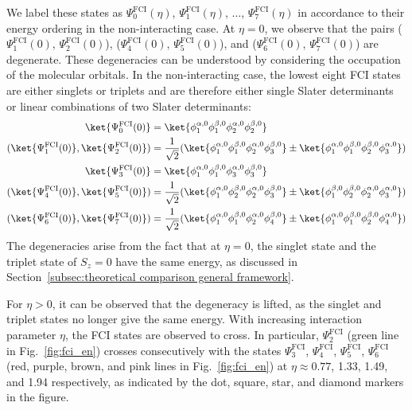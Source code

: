 \documentclass[11pt]{article}
\begin{document}
We label these states as $\Psi_0^{\mathrm{FCI}}(\eta)$, $\Psi_1^{\mathrm{FCI}}(\eta)$, $\ldots$, $\Psi_7^{\mathrm{FCI}}(\eta)$
in accordance to their energy ordering in the non-interacting case. At $\eta=0$, we observe that the pairs ($\Psi_1^{\mathrm{FCI}}(0)$, $\Psi_2^{\mathrm{FCI}}(0)$), ($\Psi_4^{\mathrm{FCI}}(0)$, $\Psi_5^{\mathrm{FCI}}(0)$), and ($\Psi_6^{\mathrm{FCI}}(0)$, $\Psi_7^{\mathrm{FCI}}(0)$) are degenerate. These degeneracies can be understood by considering the occupation of the molecular orbitals. In the non-interacting case, the lowest eight FCI states are either singlets or triplets and are therefore either single Slater determinants or linear combinations of two Slater determinants:
\begin{align*}
    \ket{\Psi_0^{\rm FCI}(0)}&=\ket{\phi_1^{\alpha,0}\phi_1^{\beta,0}\phi_2^{\alpha,0}\phi_2^{\beta,0}}\\
    (\ket{\Psi_1^{\rm FCI}(0)},\ket{\Psi_2^{\rm FCI}(0)})&=\frac{1}{\sqrt{2}}(\ket{\phi_1^{\alpha,0}\phi_1^{\beta,0}\phi_2^{\alpha,0}\phi_3^{\beta,0}}\pm\ket{\phi_1^{\alpha,0}\phi_1^{\beta,0}\phi_2^{\beta,0}\phi_3^{\alpha,0}})\\
    \ket{\Psi_3^{\rm FCI}(0)}&=\ket{\phi_1^{\alpha,0}\phi_1^{\beta,0}\phi_3^{\alpha,0}\phi_3^{\beta,0}}\\
    (\ket{\Psi_4^{\rm FCI}(0)},\ket{\Psi_5^{\rm FCI}(0)})&=\frac{1}{\sqrt{2}}(\ket{\phi_1^{\alpha,0}\phi_2^{\beta,0}\phi_2^{\alpha,0}\phi_3^{\beta,0}}\pm\ket{\phi_1^{\beta,0}\phi_2^{\beta,0}\phi_2^{\alpha,0}\phi_3^{\alpha,0}})\\
    (\ket{\Psi_6^{\rm FCI}(0)},\ket{\Psi_7^{\rm FCI}(0)})&=\frac{1}{\sqrt{2}}(\ket{\phi_1^{\alpha,0}\phi_1^{\beta,0}\phi_2^{\alpha,0}\phi_4^{\beta,0}}\pm\ket{\phi_1^{\alpha,0}\phi_1^{\beta,0}\phi_2^{\beta,0}\phi_4^{\alpha,0}})\\
\end{align*}
The degeneracies arise from the fact that at $\eta=0$, the singlet state and the triplet state of $S_z=0$ have the same energy, as discussed in Section~\ref{subsec:theoretical comparison general framework}.

For $\eta>0$, it can be observed that the degeneracy is lifted, as the singlet and triplet states no longer give the same energy. With increasing interaction parameter $\eta$, the FCI states are observed to cross. In particular, $\Psi_2^{\mathrm{FCI}}$ (green line in Fig.~\ref{fig:fci_en}) crosses consecutively with the states $\Psi_3^{\mathrm{FCI}}$, $\Psi_4^{\mathrm{FCI}}$, $\Psi_5^{\mathrm{FCI}}$, $\Psi_6^{\mathrm{FCI}}$ (red, purple, brown, and pink lines in Fig.~\ref{fig:fci_en}) at $\eta\approx0.77$, 1.33, 1.49, and 1.94 respectively, as indicated by the dot, square, star, and diamond markers in the figure.
\end{document}
